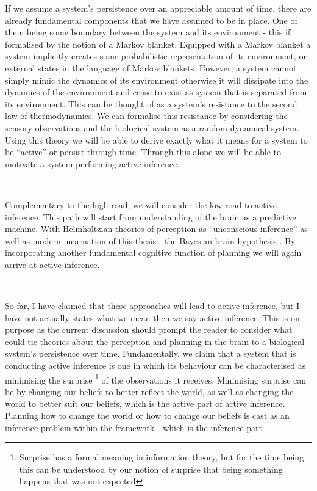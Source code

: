 \documentclass{article}
\begin{document}
If we assume a system's persistence over an appreciable amount of time, there are already fundamental components that we have assumed to be in place. One of them being some boundary between the system and its environment - this if formalised by the notion of a Markov blanket. Equipped with a Markov blanket a system implicitly creates some probabilistic representation of its environment, or external states in the language of Markov blankets. However, a system cannot simply mimic the dynamics of its environment otherwise it will dissipate  into the dynamics of the environment and cease to exist as system that is separated from its environment. This can be thought of as a system's resistance to the second law of thermodynamics. We can formalise this resistance by considering the sensory observations and the biological system as a random dynamical system. Using this theory we will be able to derive exactly what it means for a system to be ``active'' or persist through time. Through this alone we will be able to motivate a system performing active inference.

\


Complementary to the high road, we will consider the low road to active inference. This path will start from understanding of the brain as a predictive machine. With Helmholtzian theories of perception as ``unconscious inference'' \citep{helmholtz1867concerning} as well as modern incarnation of this thesis - the Bayesian brain hypothesis \citep{doya2007bayesian}. By incorporating another fundamental cognitive function of planning we will again arrive at active inference.

\

So far, I have claimed that these approaches will lead to active inference, but I have not actually states what we mean then we say active inference. This is on purpose as the current discussion should prompt the reader to consider what could tie theories about the perception and planning in the brain to a biological system's persistence over time. Fundamentally, we claim that a system that is conducting active inference is one in which its behaviour can be characterised as minimising the surprise \footnote{Surprise has a formal meaning in information theory, but for the time being this can be understood by our notion of surprise that being something happens that was not expected} of the observations it receives. Minimising surprise can be by changing our beliefs to better reflect the world, as well as changing the world to better suit our beliefs, which is the active part of active inference. Planning how to change the world or how to change our beliefs is cast as an inference problem within the framework - which is the inference part.
\end{document}
